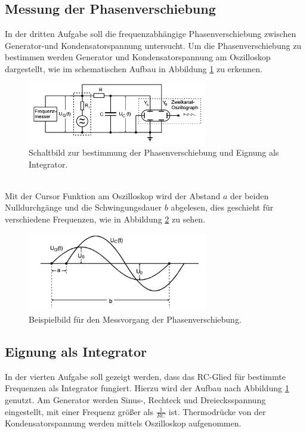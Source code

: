 \subsection{Messung der Phasenverschiebung}
In der dritten Aufgabe soll die frequenzabhängige Phasenverschiebung zwischen Generator-und Kondensatorspannung untersucht.
Um die Phasenverschiebung zu bestimmen werden Generator und Kondensatorspannung am Oszilloskop dargestellt,
wie im schematischen Aufbau in Abbildung \ref{abb:schaltbildPhase} zu erkennen.
\begin{figure}[h]
    \centering
    \includegraphics[width=0.7\textwidth]{aufbaucd.PNG}
    \caption{Schaltbild zur bestimmung der Phasenverschiebung und Eignung als Integrator.\cite{skript}}
    \label{abb:schaltbildPhase}
\end{figure}\\
Mit der Cursor Funktion am Oszilloskop wird der Abstand $a$ der beiden Nulldurchgänge und die Schwingungsdauer $b$ abgelesen, dies geschieht für verschiedene Frequenzen,
wie in Abbildung \ref{abb:Phase} zu sehen.
\begin{figure}[h]
    \centering
    \includegraphics[width=0.7\textwidth]{messungc.PNG}
    \caption{Beispielbild für den Messvorgang der Phasenverschiebung.\cite{skript}}
    \label{abb:Phase}
\end{figure}\newpage
\subsection{Eignung als Integrator}
In der vierten Aufgabe soll gezeigt werden, dass das RC-Glied für bestimmte Frequenzen als Integrator fungiert.
Hierzu wird der Aufbau nach Abbildung \ref{abb:schaltbildPhase} genutzt. Am Generator werden Sinus-, Rechteck und Dreiecksspannung eingestellt, mit einer Frequenz größer als $\frac{1}{RC}$ ist.
Thermodrücke von der Kondensatorspannung werden mittels Oszilloskop aufgenommen.
